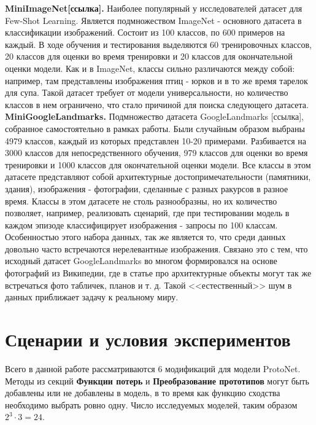 \documentclass[a4paper, 12pt]{report}
\begin{document}
\textbf {MiniImageNet[ссылка].} Наиболее популярный у исследователей датасет для Few-Shot Learning. Является подмножеством ImageNet - основного датасета в классификации изображений. Состоит из 100 классов, по 600 примеров на каждый. В ходе обучения и тестирования выделяются 60 тренировочных классов, 20 классов для оценки во время тренировки и 20 классов для окончательной оценки модели. Как и в ImageNet, классы сильно различаются между собой: например, там представлены изображения птиц - юрков и в то же время тарелок для супа. Такой датасет требует от модели универсальности, но количество классов в нем ограничено, что стало причиной для поиска следующего датасета. \\

\textbf {MiniGoogleLandmarks.} Подмножество датасета GoogleLandmarks [ссылка], собранное самостоятельно в рамках работы. Были случайным образом выбраны 4979 классов, каждый из которых представлен 10-20 примерами. Разбивается на 3000 классов для непосредственного обучения, 979 классов для оценки во время тренировки и 1000 классов для окончательной оценки модели. Все классы в этом датасете представляют собой архитектурные достопримечательности (памятники, здания), изображения - фотографии, сделанные с разных ракурсов в разное время. Классы в этом датасете не столь разнообразны, но их количество позволяет, например, реализовать сценарий, где при тестировании модель в каждом эпизоде классифицирует изображения - запросы по 100 классам. Особенностью этого набора данных, так же является то, что среди данных довольно часто встречаются нерелевантные изображения. Связано это с тем, что исходный датасет GoogleLandmarks во многом формировался на основе фотографий из Википедии, где в статье про архитектурные объекты могут так же встречаться фото табличек, планов и т. д. Такой <<естественный>> шум в данных приближает задачу к реальному миру.

\section {Сценарии и условия экспериментов}

Всего в данной работе рассматриваются 6 модификаций для модели ProtoNet. Методы из секций \textbf{Функции потерь} и \textbf{Преобразование прототипов} могут быть добавлены или не добавлены в модель, в то время как функцию сходства необходимо выбрать ровно одну. Число исследуемых моделей, таким образом $2^3 \cdot 3 = 24$.\\
\end{document}
